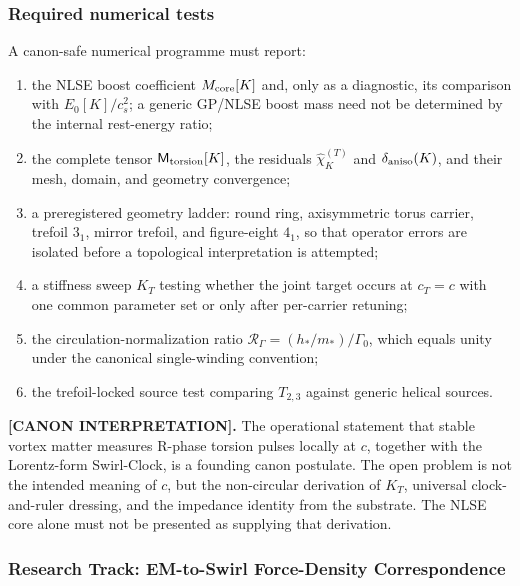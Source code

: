 \subsubsection{Required numerical tests}

A canon-safe numerical programme must report:
\begin{enumerate}
    \item the NLSE boost coefficient \(M_{\rm core}[K]\) and, only as a diagnostic,
    its comparison with \(E_0[K]/c_s^2\); a generic GP/NLSE boost mass need not be
    determined by the internal rest-energy ratio;
    \item the complete tensor \(\mathsf M_{\rm torsion}[K]\), the residuals
    \(\widehat{\chi}_K^{(T)}\) and \(\delta_{\rm aniso}(K)\), and their mesh,
    domain, and geometry convergence;
    \item a preregistered geometry ladder: round ring, axisymmetric torus carrier,
    trefoil \(3_1\), mirror trefoil, and figure-eight \(4_1\), so that operator
    errors are isolated before a topological interpretation is attempted;
    \item a stiffness sweep \(K_T\) testing whether the joint target occurs at
    \(c_T=c\) with one common parameter set or only after per-carrier retuning;
    \item the circulation-normalization ratio
    \(\mathcal R_\Gamma=(h_*/m_*)/\Gamma_0\), which equals unity under the
    canonical single-winding convention;
    \item the trefoil-locked source test comparing \(T_{2,3}\) against generic
    helical sources.
\end{enumerate}

\textbf{[CANON INTERPRETATION].}
The operational statement that stable vortex matter measures R-phase torsion
pulses locally at \(c\), together with the Lorentz-form Swirl-Clock, is a founding
canon postulate. The open problem is not the intended meaning of \(c\), but the
non-circular derivation of \(K_T\), universal clock-and-ruler dressing, and the
impedance identity from the substrate. The NLSE core alone must not be presented
as supplying that derivation.



\subsubsection{Research Track: EM-to-Swirl Force-Density Correspondence}
\label{sec:research_em_to_swirl_force_density_correspondence}

